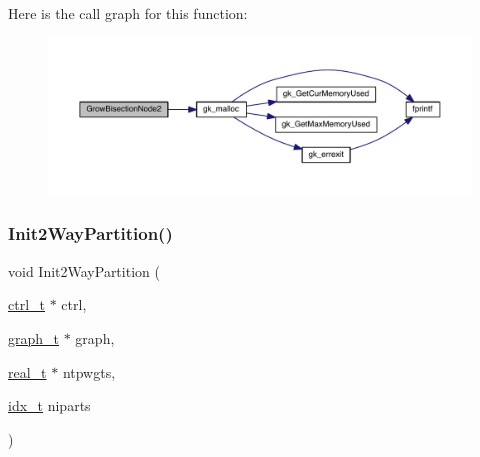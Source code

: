 Here is the call graph for this function\+:\nopagebreak
\begin{figure}[H]
\begin{center}
\leavevmode
\includegraphics[width=350pt]{a00903_a3668b93d256689991e65a85536f533c5_cgraph}
\end{center}
\end{figure}
\mbox{\label{a00903_af566aa1abb139c5b46b29c95b9ed075d}} 
\subsubsection{\texorpdfstring{Init2\+Way\+Partition()}{Init2WayPartition()}}
{\footnotesize\ttfamily void Init2\+Way\+Partition (\begin{DoxyParamCaption}\item[{\hyperlink{a00742}{ctrl\+\_\+t} $\ast$}]{ctrl,  }\item[{\hyperlink{a00734}{graph\+\_\+t} $\ast$}]{graph,  }\item[{\hyperlink{a00876_a1924a4f6907cc3833213aba1f07fcbe9}{real\+\_\+t} $\ast$}]{ntpwgts,  }\item[{\hyperlink{a00876_aaa5262be3e700770163401acb0150f52}{idx\+\_\+t}}]{niparts }\end{DoxyParamCaption})}

